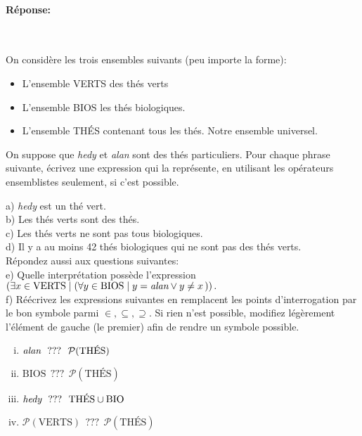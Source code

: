 \documentclass[12pt]{article}
\newcommand{\ou}{\vee}                   %
\newcommand{\dans}{\in}                  %
\newcounter{exercice}\newcommand{\exercice}{\bigskip \addtocounter{exercice}{1}\noindent \textbf{Exercice \theexercice}\\}
\begin{document}
\paragraph{Réponse:}~\\






\newpage

\exercice
On considère les trois ensembles suivants (peu importe la forme):
\begin{itemize}
\item L'ensemble VERTS des thés verts
\item L'ensemble BIOS les thés biologiques.
\item L'ensemble THÉS contenant  tous les thés. Notre ensemble universel.
\end{itemize}
On suppose que \emph{hedy} et  \emph{alan} sont des thés particuliers. 
Pour chaque phrase suivante, écrivez une expression qui la représente, en utilisant les opérateurs ensemblistes seulement, si c’est possible.

\noindent
a) \emph{hedy} est un thé vert.\\[2mm]
b) Les thés verts sont des thés.\\[2mm]
c) Les thés verts ne sont pas tous biologiques.\\[2mm]
 d) Il y a au moins 42 thés biologiques qui ne sont pas des thés verts.
 \\[3mm]
 Répondez aussi aux questions suivantes:\\[2mm]
e) 
Quelle interprétation possède l'expression \\\mbox{}\hfill$(\exists x \dans \mbox{VERTS} \mid (\forall y\in \mbox{BIOS} \mid  y=\emph{alan}\ou y\neq x \,) )\,.$\hfill\mbox{}
 \\[3mm]
f) Réécrivez les expressions suivantes en remplacent les points d'interrogation par le bon symbole parmi  $\in,\subseteq, \supseteq$. Si rien n’est possible, modifiez légèrement l'élément de gauche (le premier) afin de rendre un symbole possible.\\[-3mm]
\begin{enumerate}[i.]
\item $\emph{alan} ~~???~~ \mathcal{P}(\mbox{THÉS})$ 
\item $\mbox{BIOS} ~~???~~ \mathcal{P}(\mbox{THÉS})$
\item $\emph{hedy} ~~???~~ \mbox{THÉS} \cup \mbox{BIO}$
\item $\mathcal{P}(\mbox{VERTS}) ~~???~~ \mathcal{P}(\mbox{THÉS})$

\end{enumerate}
\end{document}
